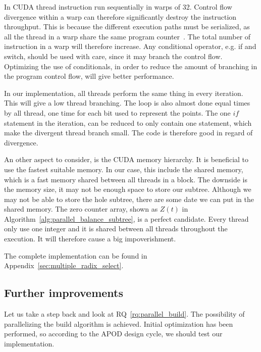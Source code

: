 In CUDA thread instruction run sequentially in warps of 32. Control flow divergence within a warp can therefore significantly destroy the instruction throughput. This is because the different execution paths must be serialized, as all the thread in a warp share the same program counter~\cite{cuda_c_best_practices_guide}. The total number of instruction in a warp will therefore increase. Any conditional operator, e.g\@. if and switch, should be used with care, since it may branch the control flow. Optimizing the use of conditionals, in order to reduce the amount of branching in the program control flow, will give better performance.

In our implementation, all threads perform the same thing in every iteration. This will give a low thread branching. The loop is also almost done equal times by all thread, one time for each bit used to represent the points. The one $if$ statement in the iteration, can be reduced to only contain one statement, which make the divergent thread branch small. The code is therefore good in regard of divergence.

An other aspect to consider, is the CUDA memory hierarchy. It is beneficial to use the fastest suitable memory. In our case, this include the shared memory, which is a fast memory shared between all threads in a block. The downside is the memory size, it may not be enough space to store our subtree. Although we may not be able to store the hole subtree, there are some date we can put in the shared memory. The zero counter array, shown as $Z(t)$ in Algorithm~\ref{alg:parallel_balance_subtree}, is a perfect candidate. Every thread only use one integer and it is shared between all threads throughout the execution. It will therefore cause a big impoverishment.

The complete implementation can be found in Appendix~\ref{sec:multiple_radix_select}.

\subsection{Further improvements} %
\label{ssub:further_development}

Let us take a step back and look at RQ~\ref{rq:parallel_build}. The possibility of parallelizing the build algorithm is achieved. Initial optimization has been performed, so according to the APOD design cycle, we should test our implementation.

